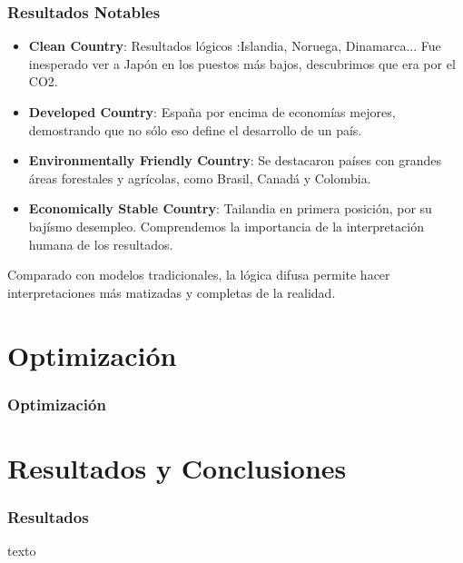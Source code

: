 \documentclass{beamer}
\newcommand{\slideauthor}[1]{\def\insertslideauthor{#1}}
\newcommand{\insertslideauthor}{}
\begin{document}
\begin{frame}
\frametitle{Resultados Notables}
\slideauthor{Javier Comyn}
    \begin{itemize}
    \item \textbf{Clean Country}: Resultados lógicos :Islandia, Noruega, Dinamarca... Fue inesperado ver a Japón en los puestos más bajos, descubrimos que era por el CO2.
    \item \textbf{Developed Country}: España por encima de economías mejores, demostrando que no sólo eso define el desarrollo de un país.
    \item \textbf{Environmentally Friendly Country}: Se destacaron países con grandes áreas forestales y agrícolas, como Brasil, Canadá y Colombia. 
    \item \textbf{Economically Stable Country}: Tailandia en primera posición, por su bajísmo desempleo. Comprendemos la importancia de la interpretación humana de los resultados.
\end{itemize}
Comparado con modelos tradicionales, la lógica difusa permite hacer interpretaciones más matizadas y completas de la realidad.
\end{frame}

\section{Optimización}
\begin{frame}
\frametitle{Optimización}
\slideauthor{Autor 2}

\end{frame}

\section{Resultados y Conclusiones}
\begin{frame}
\frametitle{Resultados}
\slideauthor{Autor 2}
texto
\end{frame}
\end{document}
